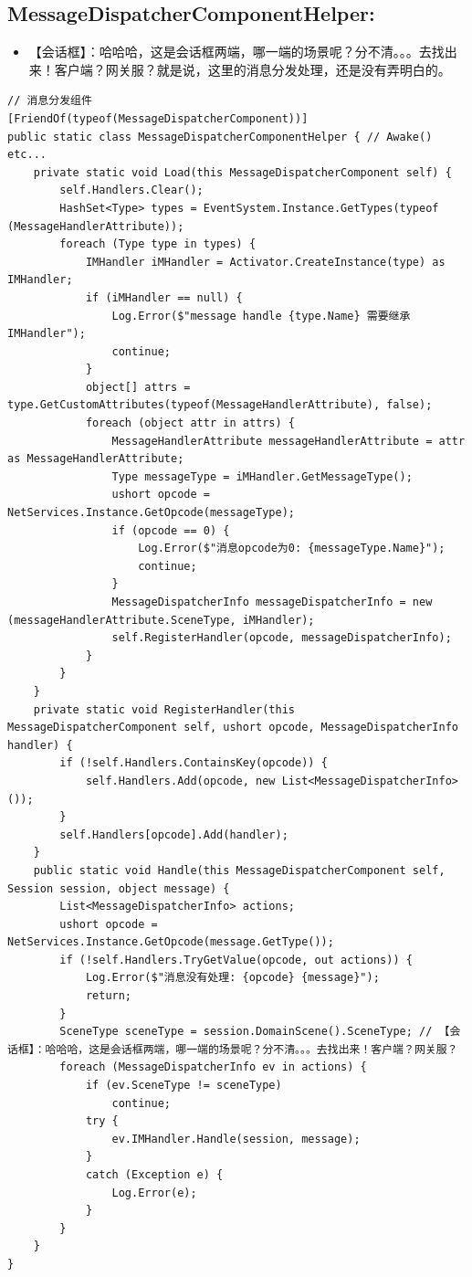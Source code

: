 \documentclass[9pt, b5paper]{article}
\begin{document}
\subsection{MessageDispatcherComponentHelper:}
\label{sec-8-13}
\begin{itemize}
\item 【会话框】：哈哈哈，这是会话框两端，哪一端的场景呢？分不清。。。去找出来！客户端？网关服？就是说，这里的消息分发处理，还是没有弄明白的。
\end{itemize}
\begin{verbatim}
// 消息分发组件
[FriendOf(typeof(MessageDispatcherComponent))]
public static class MessageDispatcherComponentHelper { // Awake() etc...
    private static void Load(this MessageDispatcherComponent self) {
        self.Handlers.Clear();
        HashSet<Type> types = EventSystem.Instance.GetTypes(typeof (MessageHandlerAttribute));
        foreach (Type type in types) {
            IMHandler iMHandler = Activator.CreateInstance(type) as IMHandler;
            if (iMHandler == null) {
                Log.Error($"message handle {type.Name} 需要继承 IMHandler");
                continue;
            }
            object[] attrs = type.GetCustomAttributes(typeof(MessageHandlerAttribute), false);
            foreach (object attr in attrs) {
                MessageHandlerAttribute messageHandlerAttribute = attr as MessageHandlerAttribute;
                Type messageType = iMHandler.GetMessageType();
                ushort opcode = NetServices.Instance.GetOpcode(messageType);
                if (opcode == 0) {
                    Log.Error($"消息opcode为0: {messageType.Name}");
                    continue;
                }
                MessageDispatcherInfo messageDispatcherInfo = new (messageHandlerAttribute.SceneType, iMHandler);
                self.RegisterHandler(opcode, messageDispatcherInfo);
            }
        }
    }
    private static void RegisterHandler(this MessageDispatcherComponent self, ushort opcode, MessageDispatcherInfo handler) {
        if (!self.Handlers.ContainsKey(opcode)) {
            self.Handlers.Add(opcode, new List<MessageDispatcherInfo>());
        }
        self.Handlers[opcode].Add(handler);
    }
    public static void Handle(this MessageDispatcherComponent self, Session session, object message) {
        List<MessageDispatcherInfo> actions;
        ushort opcode = NetServices.Instance.GetOpcode(message.GetType());
        if (!self.Handlers.TryGetValue(opcode, out actions)) {
            Log.Error($"消息没有处理: {opcode} {message}");
            return;
        }
        SceneType sceneType = session.DomainScene().SceneType; // 【会话框】：哈哈哈，这是会话框两端，哪一端的场景呢？分不清。。。去找出来！客户端？网关服？
        foreach (MessageDispatcherInfo ev in actions) {
            if (ev.SceneType != sceneType) 
                continue;
            try {
                ev.IMHandler.Handle(session, message);
            }
            catch (Exception e) {
                Log.Error(e);
            }
        }
    }
}
\end{verbatim}
\end{document}
